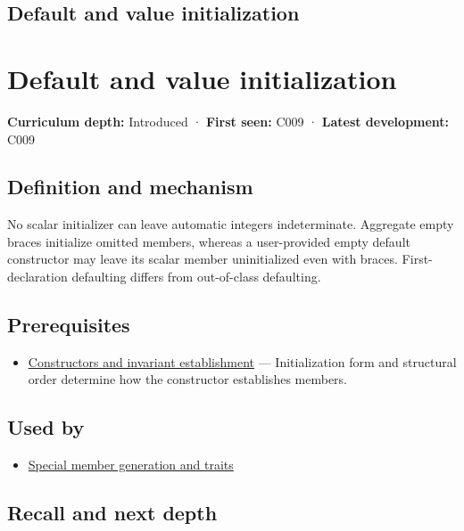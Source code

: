 \hypertarget{appendix-ba8c1a9fe03f}{}
\section*{Default and value initialization}
\chapter{Default and value initialization}\label{appendix-ba8c1a9fe03f-default-and-value-initialization}

\textbf{Curriculum depth:} Introduced · \textbf{First seen:} C009 · \textbf{Latest development:} C009

\section{Definition and mechanism}\label{appendix-ba8c1a9fe03f-definition-and-mechanism}

No scalar initializer can leave automatic integers indeterminate. Aggregate empty braces initialize omitted members, whereas a user-provided empty default constructor may leave its scalar member uninitialized even with braces. First-declaration defaulting differs from out-of-class defaulting.

\section{Prerequisites}\label{appendix-ba8c1a9fe03f-prerequisites}

\begin{itemize}
\tightlist
\item
  \hyperref[appendix-7f8ec83d0886]{Constructors and invariant establishment} --- Initialization form and structural order determine how the constructor establishes members.
\end{itemize}

\section{Used by}\label{appendix-ba8c1a9fe03f-used-by}

\begin{itemize}
\tightlist
\item
  \hyperref[appendix-42e02a12c694]{Special member generation and traits}
\end{itemize}

\section{Recall and next depth}\label{appendix-ba8c1a9fe03f-recall-and-next-depth}

